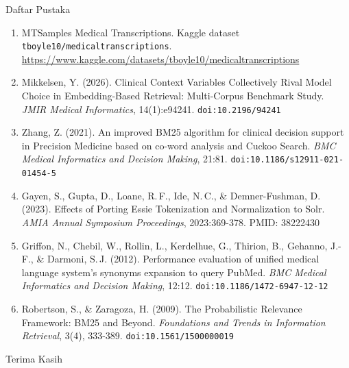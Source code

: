 \documentclass[aspectratio=169,10pt]{beamer}
\begin{document}
\begin{frame}{Daftar Pustaka}
  \scriptsize
  \setlength{\itemsep}{2pt}
  \begin{enumerate}
    \item MTSamples Medical Transcriptions. Kaggle dataset \texttt{tboyle10/medicaltranscriptions}. \url{https://www.kaggle.com/datasets/tboyle10/medicaltranscriptions}
    \item Mikkelsen, Y. (2026). Clinical Context Variables Collectively Rival Model Choice in Embedding-Based Retrieval: Multi-Corpus Benchmark Study. \textit{JMIR Medical Informatics}, 14(1):e94241. \texttt{doi:10.2196/94241}
    \item Zhang, Z. (2021). An improved BM25 algorithm for clinical decision support in Precision Medicine based on co-word analysis and Cuckoo Search. \textit{BMC Medical Informatics and Decision Making}, 21:81. \texttt{doi:10.1186/s12911-021-01454-5}
    \item Gayen, S., Gupta, D., Loane, R.\,F., Ide, N.\,C., \& Demner-Fushman, D. (2023). Effects of Porting Essie Tokenization and Normalization to Solr. \textit{AMIA Annual Symposium Proceedings}, 2023:369-378. PMID: 38222430
    \item Griffon, N., Chebil, W., Rollin, L., Kerdelhue, G., Thirion, B., Gehanno, J.-F., \& Darmoni, S.\,J. (2012). Performance evaluation of unified medical language system's synonyms expansion to query PubMed. \textit{BMC Medical Informatics and Decision Making}, 12:12. \texttt{doi:10.1186/1472-6947-12-12}
    \item Robertson, S., \& Zaragoza, H. (2009). The Probabilistic Relevance Framework: BM25 and Beyond. \textit{Foundations and Trends in Information Retrieval}, 3(4), 333-389. \texttt{doi:10.1561/1500000019}
  \end{enumerate}
\end{frame}

\begin{quoteframe}{Terima Kasih}
\end{quoteframe}
\end{document}
